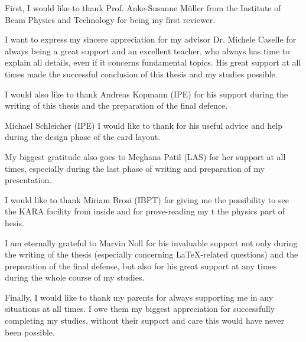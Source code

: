 First, I would like to thank Prof. Anke-Susanne Müller from the Institute of Beam Physics and Technology for being my first reviewer.

I want to express my sincere appreciation for my advisor Dr. Michele Caselle for always being a great support and an excellent teacher, who always has time to explain all details, even if it concerns fundamental topics. 
His great support at all times made the successful conclusion of this thesis and my studies possible.

I would also like to thank Andreas Kopmann (IPE) for his support during the writing of this thesis and the preparation of the final defence.

Michael Schleicher (IPE) I would like to thank for his useful advice and help during the design phase of the card layout.

My biggest gratitude also goes to Meghana Patil (LAS)  for her support at all times, especially during the last phase of writing and preparation of my presentation.

I would like to thank Miriam Brosi (IBPT) for giving me the possibility to see the KARA facility from inside and for prove-reading my t the physics part of hesis.

I am eternally grateful to Marvin Noll for his invaluable support not only during the writing of the thesis (especially concerning LaTeX-related questions) and the preparation of the final defense, but also for his great support at any times during the whole course of my studies.

Finally, I would like to thank my parents for always supporting me in any situations at all times. I owe them my biggest appreciation for successfully completing my studies, without their support and care this would have never been possible.
